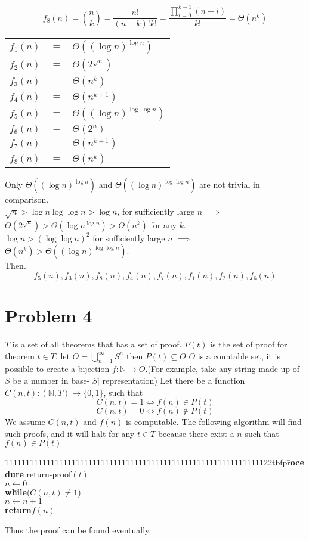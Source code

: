 \documentclass[letter]{article}
\newcommand{\N}{\mathbb{N}}
\newcommand{\aprocedure}{\tex1111111111111111111111111111111111111111111111111111111111111122tbf{pr}\=\+\textbf{ocedure}\xspace}
\newcommand{\awhile}{\textbf{wh}\=\+\textbf{ile}\xspace}
\newcommand{\aend}{\-\kill}
\newcommand{\areturn}{\textbf{return}\xspace}
\begin{document}
\[f_8(n) = \binom{n}{k} = \frac{n!}{(n-k)!k!} = \frac{\prod_{i = 0}^{k-1} (n-i)}{k!} = \Theta(n^k)\]

\begin{tabular}{rcl}
$f_1(n)$                           & $=$ & $\Theta((\log n)^{\log n})$ \\
$f_2(n)$                           & $=$ & $\Theta(2^{\sqrt{n}})$ \\
$f_3(n)$                           & $=$ & $\Theta(n^k)$ \\
$f_4(n)$                           & $=$ & $\Theta(n^{k+1})$ \\
$f_5(n)$                           & $=$ & $\Theta((\log n)^{\log\log n})$ \\
$f_6(n)$                           & $=$ & $\Theta(2^n)$ \\
$f_7(n)$                           & $=$ & $\Theta(n^{k+1})$ \\
$f_8(n)$                           & $=$ & $\Theta(n^k)$
\end{tabular}

Only $\Theta((\log n)^{\log n})$ and $\Theta((\log n)^{\log\log n})$ are not trivial in comparison.\\
$\sqrt{n} > \log n \log \log n > \log n$, for sufficiently large $n$ $\implies$ $\Theta(2^{\sqrt{n}}) > \Theta(\log n ^ {\log n}) > \Theta(n^k)$ for any $k$.\\
$\log n >(\log \log n)^2$ for sufficiently large $n$ $\implies$ $\Theta(n^k)>\Theta((\log n)^{\log\log n})$.\\
Then.
\[ f_5(n),f_3(n),f_8(n),f_4(n),f_7(n),f_1(n),f_2(n),f_6(n) \]

\section*{Problem 4}

$T$ is a set of all theorems that has a set of proof. $P(t)$ is the set of proof for theorem $t\in T$. 
let $O = \bigcup_{n=1}^\infty S^n$ then $P(t) \subseteq O$
$O$ is a countable set, it is possible to create a bijection $f:\N \to O$.(For example, take any string made up of $S$ be a number in base-$|S|$ representation) Let there be a function $C(n,t) : (\N,T) \to \{0,1\}$, such that
\[C(n,t) = 1 \Leftrightarrow f(n) \in P(t)\]
\[C(n,t) = 0 \Leftrightarrow f(n) \notin P(t)\]
We assume $C(n,t)$ and $f(n)$ is computable.
The following algorithm will find such proofs, and it will halt for any $t\in T$ because there exist a $n$ such that $f(n) \in P(t)$ \\
\begin{tabbing}
  \aprocedure return-proof$(t)$ \\
  $n\gets 0$\\
    \awhile ($C(n,t)\neq 1$)\\
       $n\gets n+1$\\
    \aend
    \areturn $f(n)$
\end{tabbing}
Thus the proof can be found eventually.
\end{document}

